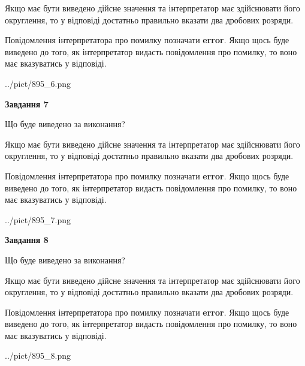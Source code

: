 \documentclass[12pt, ukrainian]{article}
\begin{document}
{\begin {Large}
Якщо має бути виведено дійсне значення та інтерпретатор має здійснювати його округлення, 
то у відповіді достатньо правильно вказати два дробових розряди.

Повідомлення інтерпретатора про помилку позначати \textbf{error}.
Якщо щось буде виведено до того, як інтерпретатор видасть повідомлення про помилку, 
то воно має вказуватись у відповіді. \par

\begin{center}
	{../pict/895_6.png}
\end{center}
\newpage

{\begin {center}\textbf{Завдання 7}\end {center}}\par
Що буде виведено за виконання? \par

Якщо має бути виведено дійсне значення та інтерпретатор має здійснювати його округлення, 
то у відповіді достатньо правильно вказати два дробових розряди.

Повідомлення інтерпретатора про помилку позначати \textbf{error}.
Якщо щось буде виведено до того, як інтерпретатор видасть повідомлення про помилку, 
то воно має вказуватись у відповіді. \par

\begin{center}
	{../pict/895_7.png}
\end{center}
\newpage

{\begin {center}\textbf{Завдання 8}\end {center}}\par
Що буде виведено за виконання? \par

Якщо має бути виведено дійсне значення та інтерпретатор має здійснювати його округлення, 
то у відповіді достатньо правильно вказати два дробових розряди.

Повідомлення інтерпретатора про помилку позначати \textbf{error}.
Якщо щось буде виведено до того, як інтерпретатор видасть повідомлення про помилку, 
то воно має вказуватись у відповіді. \par

\begin{center}
	{../pict/895_8.png}
\end{center}
\newpage


\end{Large}}
\end{document}
